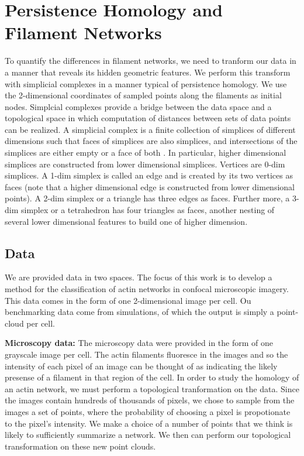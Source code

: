 \documentclass[10pt]{article}
\begin{document}
\section{Persistence Homology and Filament Networks}
To quantify the differences in filament networks, we need to tranform our data in a manner that reveals its hidden geometric features. We perform this transform with simplicial complexes in a manner typical of persistence homology. We use the 2-dimensional coordinates of sampled points along the filaments as initial nodes. Simplcial complexes provide a bridge between the data space and a topological space in which computation of distances between sets of data points can be realized. A simplicial complex is a finite collection of simplices of different dimensions such that faces of simplices are also simplices, and intersections of the simplices are either empty or a face of both \cite{edelsbrunner2010computational}. In particular, higher dimensional simplices are constructed from lower dimensional simplices. Vertices are 0-dim simplices. A 1-dim simplex is called an edge and is created by its two vertices as faces (note that a higher dimensional edge is constructed from lower dimensional points). A 2-dim simplex or a triangle has three edges as faces. Further more, a 3-dim simplex or a tetrahedron has four triangles as faces, another nesting of several lower dimensional features to build one of higher dimension.


\subsection{Data}
We are provided data in two spaces. The focus of this work is to develop a method for the classification of actin networks in confocal microscopic imagery. This data comes in the form of one 2-dimensional image per cell. Ou benchmarking data come from simulations, of which the output is simply a point-cloud per cell.

\textbf{Microscopy data:}
The microscopy data were provided in the form of one grayscale image per cell. The actin filaments fluoresce in the images and so the intensity of each pixel of an image can be thought of as indicating the likely presense of a filament in that region of the cell. In order to study the homology of an actin network, we must perform a topological tranformation on the data. Since the images contain hundreds of thousands of pixels, we chose to sample from the images a set of points, where the probability of choosing a pixel is propotionate to the pixel's intensity. We make a choice of a number of points that we think is likely to sufficiently summarize a network. We then can perform our topological transformation on these new point clouds.
\end{document}
